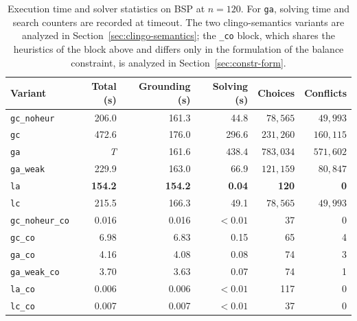 \begin{table}[H]
\centering
\small
\begin{tabular}{lrrrrr}
\toprule
\textbf{Variant} & \textbf{Total (s)} & \textbf{Grounding (s)} & \textbf{Solving (s)} & \textbf{Choices} & \textbf{Conflicts}\\
\midrule
\texttt{gc\_noheur} & 206.0 & 161.3 & 44.8 & $78{,}565$ & $49{,}993$\\
\texttt{gc}        & 472.6 & 176.0 & 296.6 & $231{,}260$ & $160{,}115$\\
\texttt{ga}        & \emph{T} & 161.6 & $438.4$ & $783{,}034$ & $571{,}602$\\
\texttt{ga\_weak}   & 229.9 & 163.0 & 66.9 & $121{,}159$ & $80{,}847$\\
\texttt{la}        & \textbf{154.2} & \textbf{154.2} & \textbf{0.04} & \textbf{120} & \textbf{0}\\
\texttt{lc}        & 215.5 & 166.3 & 49.1 & $78{,}565$ & $49{,}993$\\
\midrule[\lightrulewidth]
\texttt{gc\_noheur\_co} & 0.016 & 0.016 & $<0.01$ & 37 & 0\\
\texttt{gc\_co}     & 6.98 & 6.83 & 0.15 & 65 & 4\\
\texttt{ga\_co}     & 4.16 & 4.08 & 0.08 & 74 & 3\\
\texttt{ga\_weak\_co} & 3.70 & 3.63 & 0.07 & 74 & 1\\
\texttt{la\_co}     & 0.006 & 0.006 & $<0.01$ & 117 & 0\\
\texttt{lc\_co}     & 0.007 & 0.007 & $<0.01$ & 37 & 0\\
\bottomrule
\end{tabular}
\caption{Execution time and solver statistics on BSP at $n=120$. For \texttt{ga}, solving time and search counters are recorded at timeout. The two clingo-semantics variants are analyzed in Section~\ref{sec:clingo-semantics}; the \texttt{\_co} block, which shares the heuristics of the block above and differs only in the formulation of the balance constraint, is analyzed in Section~\ref{sec:constr-form}.}
\label{tab:bsp-n120}
\end{table}

